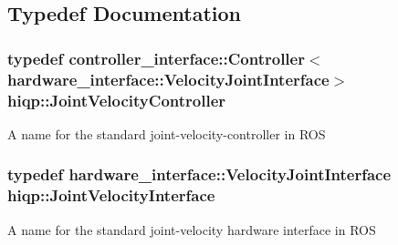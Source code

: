 \subsection{Typedef Documentation}
\hypertarget{namespacehiqp_a7b250295f6797153486ce8ab085bd450}{
\subsubsection[{Joint\-Velocity\-Controller}]{\setlength{\rightskip}{0pt plus 5cm}typedef controller\-\_\-interface\-::\-Controller$<$hardware\-\_\-interface\-::\-Velocity\-Joint\-Interface$>$ {\bf hiqp\-::\-Joint\-Velocity\-Controller}}}\label{namespacehiqp_a7b250295f6797153486ce8ab085bd450}
A name for the standard joint-\/velocity-\/controller in R\-O\-S \hypertarget{namespacehiqp_ac536ca3b4ba33489281fa5bec490799c}{
\subsubsection[{Joint\-Velocity\-Interface}]{\setlength{\rightskip}{0pt plus 5cm}typedef hardware\-\_\-interface\-::\-Velocity\-Joint\-Interface {\bf hiqp\-::\-Joint\-Velocity\-Interface}}}\label{namespacehiqp_ac536ca3b4ba33489281fa5bec490799c}
A name for the standard joint-\/velocity hardware interface in R\-O\-S 